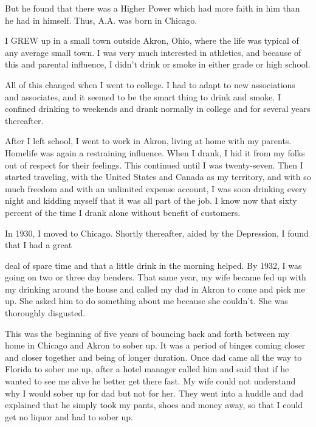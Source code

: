 
\bbChapterPreamble


\begin{biblechapter}
    But he found that there was a Higher Power 
    which had more faith in him than he had in himself.
Thus, A.A. was born in Chicago.
\end{biblechapter}


\begin{biblechapter}
    I GREW up in a small town outside Akron, Ohio, 
    where the life was typical of any average small town.
\verse I was very much interested in athletics, 
    and because of this and parental influence, 
    I didn’t drink or smoke in either grade or high school.

\verse All of this changed when I went to college.
\verse I had to adapt to new associations and associates, 
    and it seemed to be the smart thing to drink and smoke.
\verse I confined drinking to weekends 
    and drank normally in college 
    and for several years thereafter.

\verse After I left school, I went to work in Akron, living at home with my parents. Homelife was again a restraining influence. When I drank, I hid it from my folks out of respect for their feelings. This continued until I was twenty-seven. Then I started traveling, with the United States and Canada as my territory, and with so much freedom and with an unlimited expense account, I was soon drinking every night and kidding myself that it was all part of the job. I know now that sixty percent of the time I drank alone without benefit of customers.

In 1930, I moved to Chicago. Shortly thereafter, aided by the Depression, I found that I had a great

deal of spare time and that a little drink in the morning helped. By 1932, I was going on two or three day benders. That same year, my wife became fed up with my drinking around the house and called my dad in Akron to come and pick me up. She asked him to do something about me because she couldn’t. She was thoroughly disgusted.

This was the beginning of five years of bouncing back and forth between my home in Chicago and Akron to sober up. It was a period of binges coming closer and closer together and being of longer duration. Once dad came all the way to Florida to sober me up, after a hotel manager called him and said that if he wanted to see me alive he better get there fast. My wife could not understand why I would sober up for dad but not for her. They went into a huddle and dad explained that he simply took my pants, shoes and money away, so that I could get no liquor and had to sober up.


\end{biblechapter}

